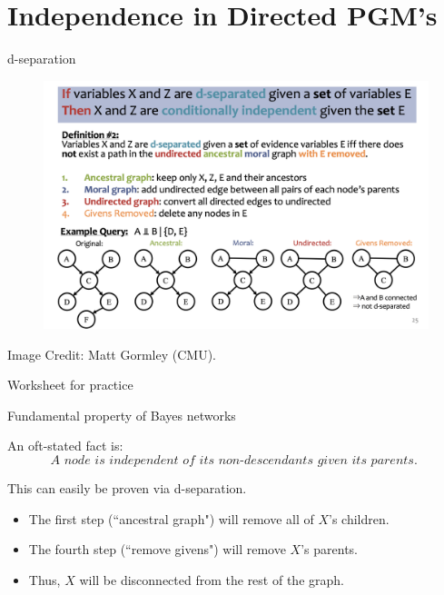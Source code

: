 \documentclass[10pt]{beamer}
\begin{document}
%  
%    

 
\section{Independence in Directed PGM's}


\begin{frame}{d-separation}

\begin{figure}[H]
\includegraphics[width=\textwidth]{images/d-separation}
\end{figure} 
\vfill
\tiny \hfill Image Credit: Matt Gormley (CMU). 
 \end{frame}
 
 
\begin{frame}{Worksheet for practice}
\end{frame}

\begin{frame}{Fundamental property of Bayes networks}

An oft-stated fact is:
\[ \textit{A node is independent of its non-descendants given its parents. } \]

This can easily be proven via d-separation.  
\begin{itemize}
\item The first step (``ancestral graph") will remove all of $X$'s children.
\item The fourth step (``remove givens") will remove $X$'s parents. 
\item Thus, $X$ will be disconnected from the rest of the graph.
\end{itemize}
\end{frame}
\end{document}
